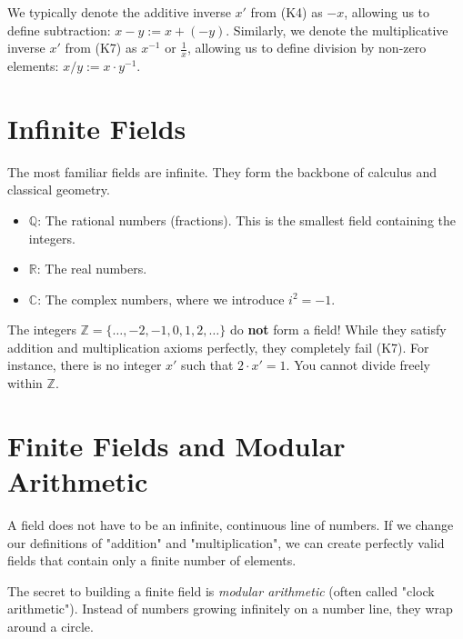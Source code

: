 \begin{remark}[Notation]
We typically denote the additive inverse $x'$ from (K4) as $-x$, allowing us to define subtraction: $x - y := x + (-y)$. 
Similarly, we denote the multiplicative inverse $x'$ from (K7) as $x^{-1}$ or $\frac{1}{x}$, allowing us to define division by non-zero elements: $x / y := x \cdot y^{-1}$.
\end{remark}

\section{Infinite Fields}

The most familiar fields are infinite. They form the backbone of calculus and classical geometry.

\begin{example}
\begin{itemize}
    \item $\mathbb{Q}$: The rational numbers (fractions). This is the smallest field containing the integers.
    \item $\mathbb{R}$: The real numbers.
    \item $\mathbb{C}$: The complex numbers, where we introduce $i^2 = -1$.
\end{itemize}
\end{example}

\begin{importantremark}
The integers $\mathbb{Z} = \{\dots, -2, -1, 0, 1, 2, \dots\}$ do \textbf{not} form a field! While they satisfy addition and multiplication axioms perfectly, they completely fail (K7). For instance, there is no integer $x'$ such that $2 \cdot x' = 1$. You cannot divide freely within $\mathbb{Z}$.
\end{importantremark}

\section{Finite Fields and Modular Arithmetic}

A field does not have to be an infinite, continuous line of numbers. If we change our definitions of "addition" and "multiplication", we can create perfectly valid fields that contain only a finite number of elements.

The secret to building a finite field is \textit{modular arithmetic} (often called "clock arithmetic"). Instead of numbers growing infinitely on a number line, they wrap around a circle.

